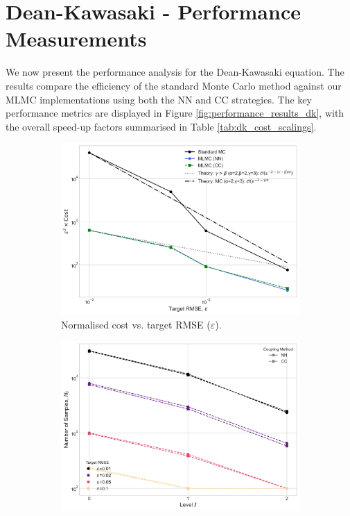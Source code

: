 \section{Dean-Kawasaki - Performance Measurements}

We now present the performance analysis for the Dean-Kawasaki equation. The results compare 
the efficiency of the standard Monte Carlo method against our MLMC implementations using 
both the NN and CC strategies. The key performance metrics are displayed in 
Figure \ref{fig:performance_results_dk}, with the overall speed-up factors 
summarised in Table \ref{tab:dk_cost_scalings}.


\begin{figure}[htbp]
    \centering
    \begin{subfigure}{0.45\textwidth}
        \centering
        \includegraphics[width=\linewidth]{graphics/dk_costs.png}
        \caption{Normalised cost vs. target RMSE ($\varepsilon$).}
        \label{fig:dk_performance}
    \end{subfigure}
    \hfill
    \begin{subfigure}{0.45\textwidth}
        \centering
        \includegraphics[width=\linewidth]{graphics/dk_nums.png}

\end{subfigure}
\end{figure}
